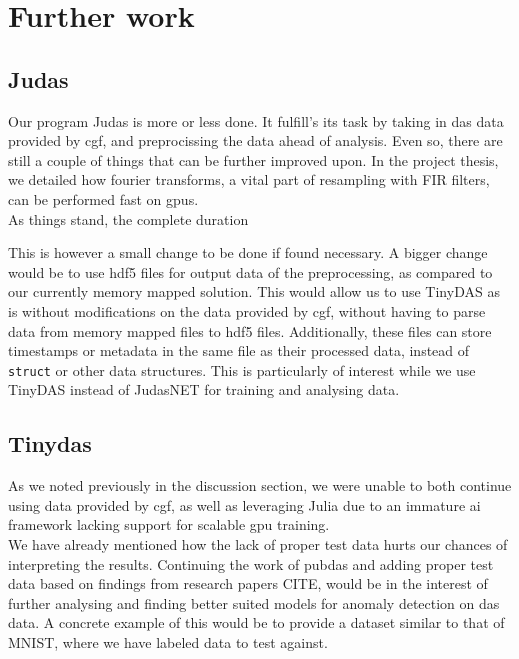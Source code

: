 \section{Further work}
\label{conc:further}

\subsection{Judas}

Our program Judas is more or less done. It fulfill's its task by taking in \acrshort{das} data provided by \acrshort{cgf}, and preprocissing the data ahead of analysis. Even so, there are still a couple of things that can be further improved upon. In the project thesis, we detailed how fourier transforms, a vital part of resampling with FIR filters, can be performed fast on \acrshort{gpu}s. \\

As things stand, the complete duration

This is however a small change to be done if found necessary. A bigger change would be to use \acrshort{hdf5} files for output data of the preprocessing, as compared to our currently memory mapped solution. This would allow us to use TinyDAS as is without modifications on the data provided by \acrshort{cgf}, without having to parse data from memory mapped files to \acrshort{hdf5} files. Additionally, these files can store timestamps or metadata in the same file as their processed data, instead of \texttt{struct} or other data structures. This is particularly of interest while we use TinyDAS instead of JudasNET for training and analysing data.

\subsection{Tinydas}

As we noted previously in the discussion section, we were unable to both continue using data provided by \acrshort{cgf}, as well as leveraging Julia due to an immature \acrshort{ai} framework lacking support for scalable \acrshort{gpu} training. \\

We have already mentioned how the lack of proper test data hurts our chances of interpreting the results. Continuing the work of \Gls{pubdas} and adding proper test data based on findings from research papers CITE, would be in the interest of further analysing and finding better suited models for anomaly detection on \acrshort{das} data. A concrete example of this would be to provide a dataset similar to that of MNIST, where we have labeled data to test against. \\

